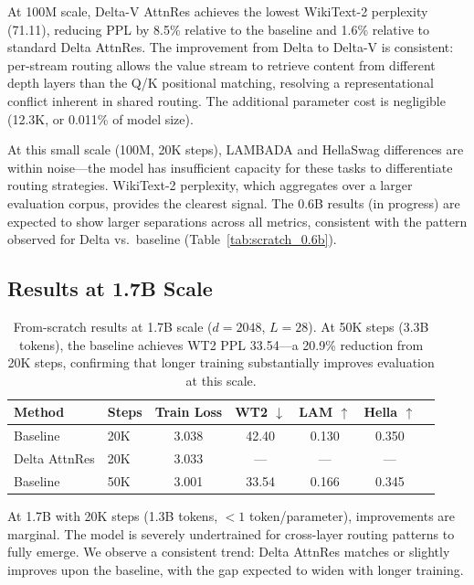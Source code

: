\documentclass{article}
\begin{document}
At 100M scale, Delta-V AttnRes achieves the lowest WikiText-2 perplexity (71.11), reducing PPL by 8.5\% relative to the baseline and 1.6\% relative to standard Delta AttnRes. The improvement from Delta to Delta-V is consistent: per-stream routing allows the value stream to retrieve content from different depth layers than the Q/K positional matching, resolving a representational conflict inherent in shared routing. The additional parameter cost is negligible (12.3K, or 0.011\% of model size).

At this small scale (100M, 20K steps), LAMBADA and HellaSwag differences are within noise---the model has insufficient capacity for these tasks to differentiate routing strategies. WikiText-2 perplexity, which aggregates over a larger evaluation corpus, provides the clearest signal. The 0.6B results (in progress) are expected to show larger separations across all metrics, consistent with the pattern observed for Delta vs.\ baseline (Table~\ref{tab:scratch_0.6b}).

\subsection{Results at 1.7B Scale}

\begin{table}[h]
\centering
\caption{From-scratch results at 1.7B scale ($d{=}2048$, $L{=}28$). At 50K steps (3.3B tokens), the baseline achieves WT2 PPL 33.54---a 20.9\% reduction from 20K steps, confirming that longer training substantially improves evaluation at this scale.}
\label{tab:scratch_1.7b}
\begin{tabular}{llccccc}
\toprule
\textbf{Method} & \textbf{Steps} & \textbf{Train Loss} & \textbf{WT2 $\downarrow$} & \textbf{LAM $\uparrow$} & \textbf{Hella $\uparrow$} \\
\midrule
Baseline & 20K & 3.038 & 42.40 & 0.130 & 0.350 \\
Delta AttnRes & 20K & 3.033 & --- & --- & --- \\
\midrule
Baseline & 50K & 3.001 & 33.54 & 0.166 & 0.345 \\
\bottomrule
\end{tabular}
\end{table}

At 1.7B with 20K steps (1.3B tokens, ${<}1$ token/parameter), improvements are marginal. The model is severely undertrained for cross-layer routing patterns to fully emerge. We observe a consistent trend: Delta AttnRes matches or slightly improves upon the baseline, with the gap expected to widen with longer training.
\end{document}
